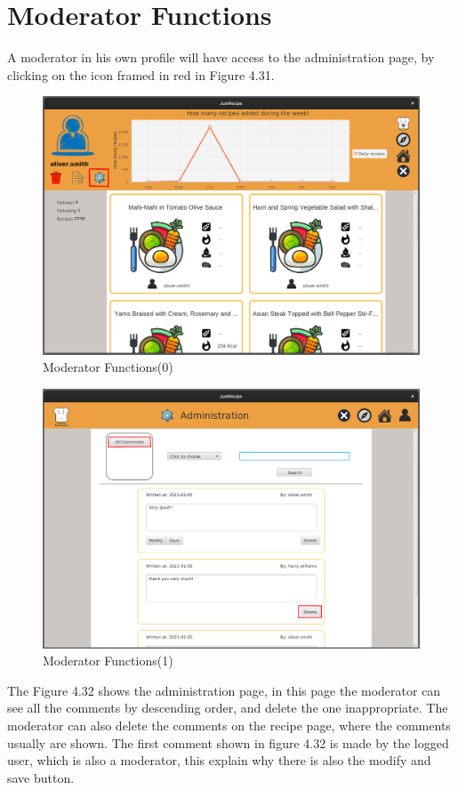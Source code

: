 \documentclass[a4paper]{report}
\begin{document}
\section{Moderator Functions}
A moderator in his own profile will have access to the administration page, by clicking on the icon framed in red in Figure 4.31.
\begin{figure}[htpb]
	\centering
	\includegraphics[scale=0.37]{img/user_manual/moderatorFunction0.png}
	\caption{Moderator Functions(0)}
\end{figure}
\begin{figure}[htpb]
	\centering
	\includegraphics[scale=0.37]{img/user_manual/moderatorFunction1.png}
	\caption{Moderator Functions(1)}
\end{figure}
The Figure 4.32 shows the administration page, in this page the moderator can see all the comments by descending order, and delete the one inappropriate. The moderator can also delete the comments on the recipe page, where the comments usually are shown. The first comment shown in figure 4.32 is made by the logged user, which is also a moderator, this explain why there is also the modify and save button.
\end{document}
